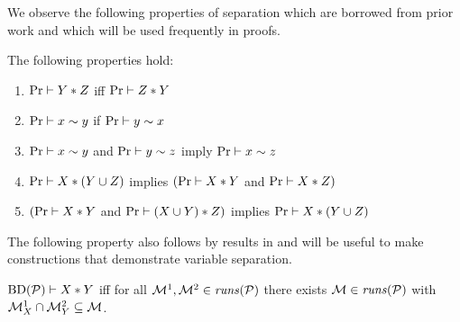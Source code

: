 We observe the following properties of separation which are borrowed from prior work
\cite{barthe2019probabilistic} and which will be used frequently in proofs. 
\begin{lemma}
  \label{lemma-separation}
  The following properties hold:
  \begin{enumerate}
  \item $\mathrm{Pr} \vdash Y * Z$ iff $\mathrm{Pr} \vdash Z * Y$
  \item $\mathrm{Pr} \vdash x \sim y$ if  $\mathrm{Pr} \vdash y \sim x$
  \item $\mathrm{Pr} \vdash x \sim y$ and $\mathrm{Pr} \vdash y \sim z$ imply $\mathrm{Pr} \vdash x \sim z$
  \item $\mathrm{Pr} \vdash X * (Y \cup Z)$ implies $(\mathrm{Pr} \vdash X * Y$ and $\mathrm{Pr} \vdash X * Z)$
  \item $(\mathrm{Pr} \vdash X * Y$ and $\mathrm{Pr} \vdash (X \cup Y) * Z)$ implies $\mathrm{Pr} \vdash X * (Y \cup Z)$ 
  \end{enumerate}
\end{lemma}
The following property also follows by results in \cite{barthe2019probabilistic} and will
be useful to make constructions that demonstrate variable separation.
\begin{lemma}
  \label{lemma-sepjoin}
  $\mathrm{BD}(\mathcal{P}) \vdash X * Y$ iff for all 
  $\mathcal{M}^1, \mathcal{M}^2 \in \mathit{runs}(\mathcal{P})$ there exists
  $\mathcal{M} \in \mathit{runs}(\mathcal{P})$ with
  $\mathcal{M}^1_{X} \cap \mathcal{M}^2_{Y} \subseteq \mathcal{M}$.
\end{lemma}


